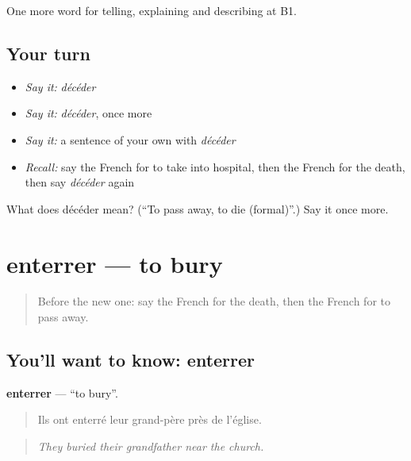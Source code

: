 \begin{grammarlens}[title={What you've built}]
One more word for telling, explaining and describing at B1.
\end{grammarlens}

\subsection*{Your turn}
\begin{itemize}
\raggedright
  \item \emph{Say it:} \emph{décéder}
  \item \emph{Say it:} \emph{décéder}, once more
  \item \emph{Say it:} a sentence of your own with \emph{décéder}
  \item \emph{Recall:} say the French for to take into hospital, then the French for the death, then say \emph{décéder} again
\end{itemize}

\begin{tcolorbox}[breakable,colback=teal!4,colframe=teal!35!black,title={Before you move on}]
What does décéder mean? (\textquotedblleft{}To pass away, to die (formal)\textquotedblright{}.) Say it once more.
\end{tcolorbox}
\section[enterrer]{enterrer — to bury}

\label{lesson:FR-C314-enterrer}



\begin{quote}
Before the new one: say the French for the death, then the French for to pass away.
\end{quote}

\subsection*{You'll want to know: enterrer}
\textbf{enterrer} — \textquotedblleft{}to bury\textquotedblright{}.

\begin{quote}
Ils ont enterré leur grand-père près de l'église.
\end{quote}

\begin{quote}
\emph{They buried their grandfather near the church.}
\end{quote}

